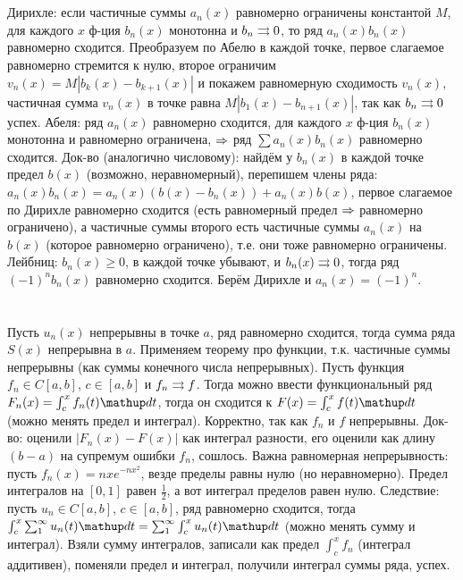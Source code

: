 \section{} %
Дирихле: если частичные суммы $a_n(x)$ равномерно ограничены константой $M$, для каждого $x$ ф-ция $b_n(x)$ монотонна и $b_n \rightrightarrows 0$, то ряд $a_n(x)b_n(x)$ равномерно сходится.
Преобразуем по Абелю в каждой точке, первое слагаемое равномерно стремится к нулю, второе ограничим $v_n(x)=M|b_k(x)-b_{k+1}(x)|$ и покажем равномерную сходимость $v_n(x)$,
частичная сумма $v_n(x)$ в точке равна $M|b_1(x)-b_{n+1}(x)|$, так как $b_n \rightrightarrows 0$ успех.
Абеля: ряд $a_n(x)$ равномерно сходится, для каждого $x$ ф-ция $b_n(x)$ монотонна и равномерно ограничена, $\Rightarrow$ ряд $\sum a_n(x)b_n(x)$ равномерно сходится.
Док-во (аналогично числовому): найдём у $b_n(x)$ в каждой точке предел $b(x)$ (возможно, неравномерный), перепишем члены ряда: $a_n(x)b_n(x) = a_n(x)(b(x)-b_n(x)) + a_n(x)b(x)$,
первое слагаемое по Дирихле равномерно сходится (есть равномерный предел $\Rightarrow$ равномерно ограничено), а частичные суммы второго есть частичные суммы $a_n(x)$ на $b(x)$ (которое равномерно ограничено),
т.е. они тоже равномерно ограничены.
Лейбниц: $b_n(x) \ge 0$, в каждой точке убывают, и $b_n(x) \rightrightarrows 0$, тогда ряд $(-1)^nb_n(x)$ равномерно сходится.
Берём Дирихле и $a_n(x)=(-1)^n$.

\section{} %
Пусть $u_n(x)$ непрерывны в точке $a$, ряд равномерно сходится, тогда сумма ряда $S(x)$ непрерывна в $a$.
Применяем теорему про функции, т.к. частичные суммы непрерывны (как суммы конечного числа непрерывных).
Пусть функция $f_n \in C[a, b]$, $c \in [a,b]$ и $f_n \rightrightarrows f$.
Тогда можно ввести функциональный ряд $F_n(x)=\int_c^x f_n(t) \d t$, тогда он сходится к $F(x)=\int_c^x f(t)\d t$ (можно менять предел и интеграл).
Корректно, так как $f_n$ и $f$ непрерывны.
Док-во: оценили $|F_n(x)-F(x)|$ как интеграл разности, его оценили как длину $(b-a)$ на супремум ошибки $f_n$, сошлось.
Важна равномерная непрерывность: пусть $f_n(x)=nxe^{-nx^2}$, везде пределы равны нулю (но неравномерно).
Предел интегралов на $[0,1]$ равен $\frac 1 2$, а вот интеграл пределов равен нулю.
Следствие: пусть $u_n \in C[a, b]$, $c \in [a,b]$, ряд равномерно сходится, тогда $\int_c^x \sum_1^\infty u_n(t) \d t = \sum_1^\infty \int_c^x u_n(t) \d t$ (можно менять сумму и интеграл).
Взяли сумму интегралов, записали как предел $\int_c^x f_n$ (интеграл аддитивен), поменяли предел и интеграл, получили интеграл суммы ряда, успех.

